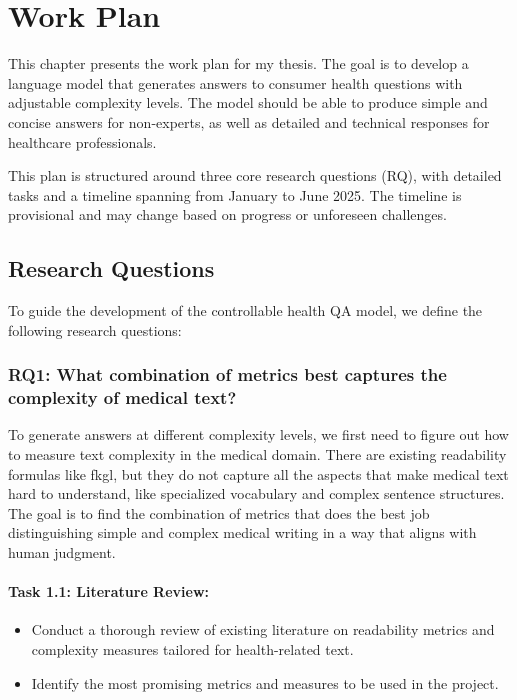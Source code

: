 \chapter{Work Plan}
\label{c3}

This chapter presents the work plan for my thesis.
The goal is to develop a language model that generates answers to consumer health questions with adjustable complexity levels.
The model should be able to produce simple and concise answers for non-experts, as well as detailed and technical responses for healthcare professionals.

This plan is structured around three core research questions (RQ), with detailed tasks and a timeline spanning from January to June 2025. 
The timeline is provisional and may change based on progress or unforeseen challenges.

\section{Research Questions}
To guide the development of the controllable health QA model, we define the following research questions:

\subsection*{RQ1: What combination of metrics best captures the complexity of medical text?}

To generate answers at different complexity levels, we first need to figure out how to measure text complexity in the medical domain. 
There are existing readability formulas like \gls{fkgl}, but they do not capture all the aspects that make medical text hard to understand, like specialized vocabulary and complex sentence structures. 
The goal is to find the combination of metrics that does the best job distinguishing simple and complex medical writing in a way that aligns with human judgment.

\subsubsection*{Task 1.1: Literature Review:}

\begin{itemize}
    \item Conduct a thorough review of existing literature on readability metrics and complexity measures tailored for health-related text.
    \item Identify the most promising metrics and measures to be used in the project.
\end{itemize}

